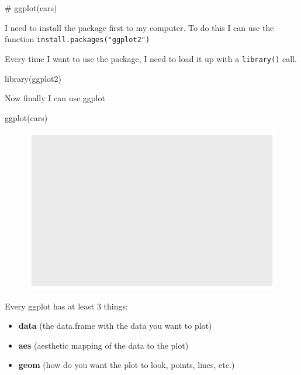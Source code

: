 \documentclass[
  letterpaper,
  DIV=11,
  numbers=noendperiod]{scrartcl}
\newenvironment{Shaded}{\begin{snugshade}}{\end{snugshade}}
\newcommand{\CommentTok}[1]{\textcolor[rgb]{0.37,0.37,0.37}{#1}}
\newcommand{\FunctionTok}[1]{\textcolor[rgb]{0.28,0.35,0.67}{#1}}
\newcommand{\NormalTok}[1]{\textcolor[rgb]{0.00,0.23,0.31}{#1}}
\providecommand{\tightlist}{%
  \setlength{\itemsep}{0pt}\setlength{\parskip}{0pt}}\usepackage{longtable,booktabs,array}
\begin{document}
\begin{Shaded}
\begin{Highlighting}[]
\CommentTok{\# ggplot(cars)}
\end{Highlighting}
\end{Shaded}

I need to install the package first to my computer. To do this I can use
the function \texttt{install.packages("ggplot2")}

Every time I want to use the package, I need to load it up with a
\texttt{library()} call.

\begin{Shaded}
\begin{Highlighting}[]
\FunctionTok{library}\NormalTok{(ggplot2)}
\end{Highlighting}
\end{Shaded}

Now finally I can use ggplot

\begin{Shaded}
\begin{Highlighting}[]
\FunctionTok{ggplot}\NormalTok{(cars)}
\end{Highlighting}
\end{Shaded}

\begin{figure}[H]

{\centering \includegraphics{Class05_files/figure-pdf/unnamed-chunk-4-1.pdf}

}

\end{figure}

Every ggplot has at least 3 things:

\begin{itemize}
\tightlist
\item
  \textbf{data} (the data.frame with the data you want to plot)
\item
  \textbf{aes} (aesthetic mapping of the data to the plot)
\item
  \textbf{geom} (how do you want the plot to look, points, lines, etc.)
\end{itemize}
\end{document}
